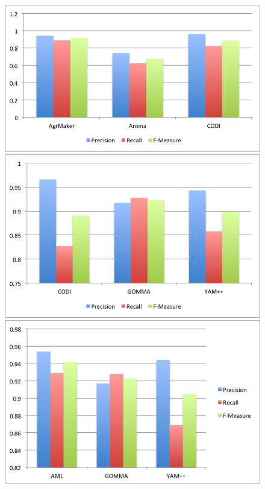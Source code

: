 \documentclass[11pt,titlepage,oneside,openany,a4paper]{report}
\begin{document}
\begin{figure}
 \includegraphics[scale=.5]{figures/oaei/anatomy/top2011.png} 
 \includegraphics[scale=.5]{figures/oaei/anatomy/top2012.png}
 \includegraphics[scale=.5]{figures/oaei/anatomy/top2013.png}  

\end{figure}
\end{document}
